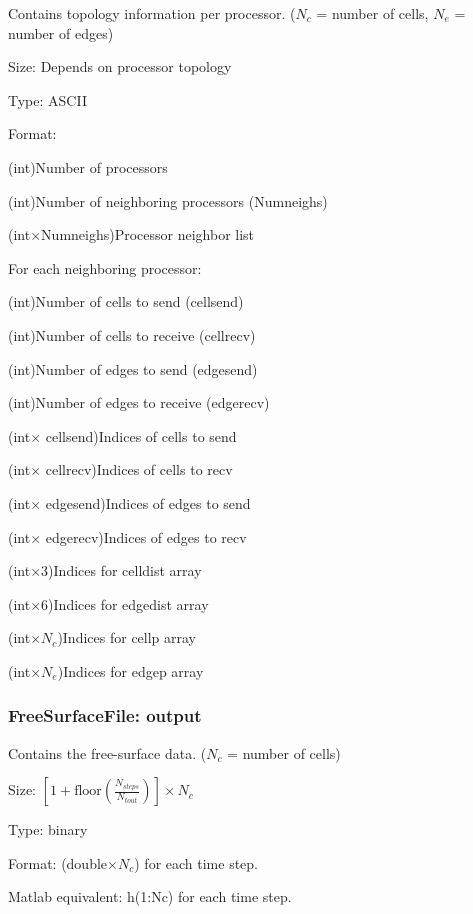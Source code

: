 \documentclass[12pt,oneside]{article}
\begin{document}
Contains topology information per processor. ($N_c$ = number of cells, $N_e$ = number of edges)
\begin{list}{}
\item Size: Depends on processor topology
\item Type: ASCII
\item Format:
\begin{list}{}
\item (int)Number of processors
\item (int)Number of neighboring processors (Numneighs)
\item (int$\times$Numneighs)Processor neighbor list
\item For each neighboring processor:
\begin{list}{}
\item (int)Number of cells to send (cellsend)
\item (int)Number of cells to receive (cellrecv)
\item (int)Number of edges to send (edgesend)
\item (int)Number of edges to receive (edgerecv)
\item (int$\times$ cellsend)Indices of cells to send
\item (int$\times$ cellrecv)Indices of cells to recv
\item (int$\times$ edgesend)Indices of edges to send
\item (int$\times$ edgerecv)Indices of edges to recv
\end{list}
\item (int$\times$3)Indices for celldist array
\item (int$\times$6)Indices for edgedist array
\item (int$\times N_c$)Indices for cellp array
\item (int$\times N_e$)Indices for edgep array
\end{list}
\end{list}

\subsubsection{FreeSurfaceFile: output}

Contains the free-surface data. ($N_c$ = number of cells)
\begin{list}{}
\item Size: $\left[1+\mbox{floor}\left(\frac{N_{steps}}{N_{tout}}\right)\right]\times N_c$
\item Type: binary
\item Format: (double$\times N_c$) for each time step.  
\item Matlab equivalent: h(1:Nc) for each time step.
\end{list}
\end{document}

